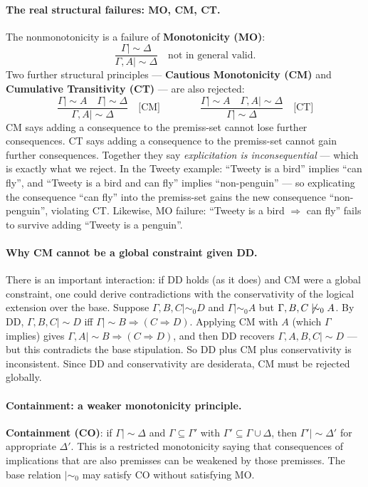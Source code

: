 \documentclass[a4paper,11pt]{report}
\newcommand{\ms}{\mathrel{\mid\!\sim}}
\newcommand{\mszero}{\mathrel{\mid\!\sim_{0}}}
\begin{document}
\paragraph{The real structural failures: MO, CM, CT.}
The nonmonotonicity is a failure of \textbf{Monotonicity (MO)}:
\[
  \frac{\Gamma \ms \Delta}{\Gamma, A \ms \Delta} \quad \text{not in general valid.}
\]
Two further structural principles --- \textbf{Cautious Monotonicity (CM)} and
\textbf{Cumulative Transitivity (CT)} --- are also rejected:
\[
  \frac{\Gamma \ms A \quad \Gamma \ms \Delta}{\Gamma, A \ms \Delta} \quad \text{[CM]}
  \qquad\qquad
  \frac{\Gamma \ms A \quad \Gamma, A \ms \Delta}{\Gamma \ms \Delta} \quad \text{[CT]}
\]
CM says adding a consequence to the premiss-set cannot lose further consequences.
CT says adding a consequence to the premiss-set cannot gain further consequences.
Together they say \emph{explicitation is inconsequential} --- which is exactly what we
reject. In the Tweety example: ``Tweety is a bird'' implies ``can fly'', and
``Tweety is a bird and can fly'' implies ``non-penguin'' --- so explicating the consequence
``can fly'' into the premiss-set gains the new consequence ``non-penguin'', violating CT.
Likewise, MO failure: ``Tweety is a bird $\Rightarrow$ can fly'' fails to survive adding
``Tweety is a penguin''.

\paragraph{Why CM cannot be a global constraint given DD.}
There is an important interaction: if DD holds (as it does) and CM were a global constraint,
one could derive contradictions with the conservativity of the logical extension over the
base. Suppose $\Gamma, B, C \mszero D$ and $\Gamma \mszero A$ but $\Gamma, B, C \not\mszero A$.
By DD, $\Gamma, B, C \ms D$ iff $\Gamma \ms B \Rightarrow (C \Rightarrow D)$.
Applying CM with $A$ (which $\Gamma$ implies) gives $\Gamma, A \ms B \Rightarrow (C \Rightarrow D)$,
and then DD recovers $\Gamma, A, B, C \ms D$ --- but this contradicts the base stipulation.
So DD plus CM plus conservativity is inconsistent. Since DD and conservativity are
desiderata, CM must be rejected globally.

\paragraph{Containment: a weaker monotonicity principle.}
\textbf{Containment (CO)}: if $\Gamma \ms \Delta$ and $\Gamma \subseteq \Gamma'$
with $\Gamma' \subseteq \Gamma \cup \Delta$, then $\Gamma' \ms \Delta'$ for appropriate
$\Delta'$. This is a restricted monotonicity saying that consequences of implications
that are also premisses can be weakened by those premisses. The base relation $\mszero$
may satisfy CO without satisfying MO.
\end{document}
